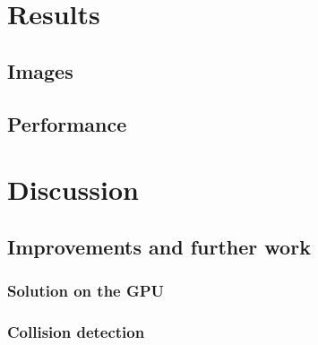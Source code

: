\documentclass[10pt,a4paper]{article}
\begin{document}
\section{Results}
\subsection{Images}

\subsection{Performance}

\section{Discussion}
\subsection{Improvements and further work}
\subsubsection{Solution on the GPU}


\subsubsection{Collision detection}


\pagebreak
{}


\end{document}
